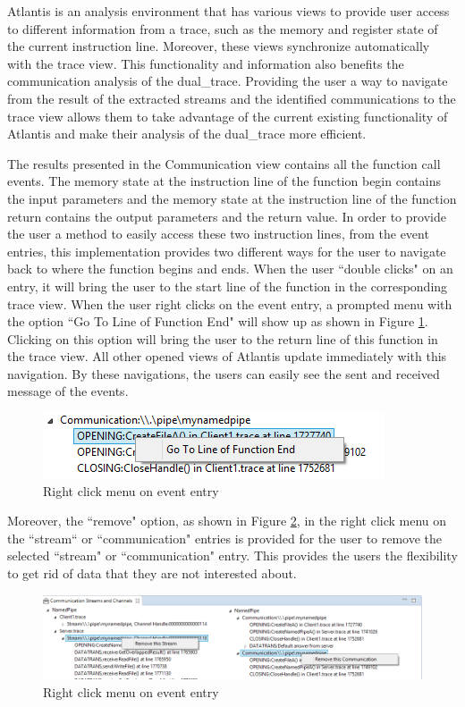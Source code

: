 Atlantis is an analysis environment that has various views to provide user access to different information from a trace, such as the memory and register state of the current instruction line. Moreover, these views synchronize automatically with the trace view. This functionality and information also benefits the communication analysis of the dual\_trace. Providing the user a way to navigate from the result of the extracted streams and the identified communications to the trace view allows them to take advantage of the current existing functionality of Atlantis and make their analysis of the dual\_trace more efficient.

The results presented in the Communication view contains all the function call events. The memory state at the instruction line of the function begin contains the input parameters and the memory state at the instruction line of the function return contains the output parameters and the return value. In order to provide the user a method to easily access these two instruction lines, from the event entries, this implementation provides two different ways for the user to navigate back to where the function begins and ends. When the user ``double clicks" on an entry, it will bring the user to the start line of the function in the corresponding trace view. When the user right clicks on the event entry, a prompted menu with the option ``Go To Line of Function End" will show up as shown in Figure \ref{gotoend}. Clicking on this option will bring the user to the return line of this function in the trace view. All other opened views of Atlantis update immediately with this navigation. By these navigations, the users can easily see the sent and received message of the events.

\begin{figure}[H]
\centerline{\includegraphics{Figures/gotoend}}
 \caption{Right click menu on event entry}
\label{gotoend}
\end{figure}

Moreover, the ``remove" option, as shown in Figure \ref{remove}, in the right click menu on the ``stream“ or ``communication" entries is provided for the user to remove the selected ``stream" or ``communication" entry. This provides the users the flexibility to get rid of data that they are not interested about.

\begin{figure}[H]
\centerline{\includegraphics[scale=0.7]{Figures/remove}}
 \caption{Right click menu on event entry}
\label{remove}
\end{figure}

